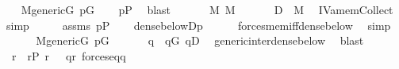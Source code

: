 \begin{isabellebody}
\ \ \isamarkupfalse%
\ {\isacartoucheopen}M{\isacharunderscore}{\kern0pt}generic{\isacharparenleft}{\kern0pt}G{\isacharparenright}{\kern0pt}{\isacartoucheclose}\ {\isacartoucheopen}p{\isasymin}G{\isacartoucheclose}\isanewline
\ \ \isamarkupfalse%
\ {\isachardoublequoteopen}p{\isasymin}P{\isachardoublequoteclose}\ \isamarkupfalse%
\ blast\isanewline
\ \ \isamarkupfalse%
\isanewline
\ \ \isamarkupfalse%
\ {\isacartoucheopen}{\isasympi}{\isasymin}M{\isacartoucheclose}\ {\isacartoucheopen}{\isasymtau}{\isasymin}M{\isacartoucheclose}\isanewline
\ \ \isamarkupfalse%
\isanewline
\ \ \isamarkupfalse%
\ {\isachardoublequoteopen}{\isacharquery}{\kern0pt}D\ {\isasymin}\ M{\isachardoublequoteclose}\ \isamarkupfalse%
\ IV{}{}{}a{\isacharunderscore}{\kern0pt}mem{\isacharunderscore}{\kern0pt}Collect\ \isamarkupfalse%
\ simp\isanewline
\ \ \isamarkupfalse%
\ \isamarkupfalse%
\ assms\ {\isacartoucheopen}p{\isasymin}P{\isacartoucheclose}\isanewline
\ \ \isamarkupfalse%
\ {\isachardoublequoteopen}dense{\isacharunderscore}{\kern0pt}below{\isacharparenleft}{\kern0pt}{\isacharquery}{\kern0pt}D{\isacharcomma}{\kern0pt}p{\isacharparenright}{\kern0pt}{\isachardoublequoteclose}\isanewline
\ \ \ \ \isamarkupfalse%
\ forces{\isacharunderscore}{\kern0pt}mem{\isacharunderscore}{\kern0pt}iff{\isacharunderscore}{\kern0pt}dense{\isacharunderscore}{\kern0pt}below\ \isamarkupfalse%
\ simp\isanewline
\ \ \isamarkupfalse%
\isanewline
\ \ \isamarkupfalse%
\ {\isacartoucheopen}M{\isacharunderscore}{\kern0pt}generic{\isacharparenleft}{\kern0pt}G{\isacharparenright}{\kern0pt}{\isacartoucheclose}\ {\isacartoucheopen}p{\isasymin}G{\isacartoucheclose}\isanewline
\ \ \isamarkupfalse%
\isanewline
\ \ \isamarkupfalse%
\ q\ \ {\isachardoublequoteopen}q{\isasymin}G{\isachardoublequoteclose}\ {\isachardoublequoteopen}q{\isasymin}{\isacharquery}{\kern0pt}D{\isachardoublequoteclose}\ \isamarkupfalse%
\ generic{\isacharunderscore}{\kern0pt}inter{\isacharunderscore}{\kern0pt}dense{\isacharunderscore}{\kern0pt}below\ \isamarkupfalse%
\ blast\isanewline
\ \ \isamarkupfalse%
\isanewline
\ \ \isamarkupfalse%
\ {\isasymsigma}\ r\ \ {\isachardoublequoteopen}r{\isasymin}P{\isachardoublequoteclose}\ {\isachardoublequoteopen}{\isasymlangle}{\isasymsigma}{\isacharcomma}{\kern0pt}r{\isasymrangle}\ {\isasymin}\ {\isasymtau}{\isachardoublequoteclose}\ {\isachardoublequoteopen}q{\isasympreceq}r{\isachardoublequoteclose}\ {\isachardoublequoteopen}forces{\isacharunderscore}{\kern0pt}eq{\isacharparenleft}{\kern0pt}q{\isacharcomma}{\kern0pt}{\isasympi}{\isacharcomma}{\kern0pt}{\isasymsigma}{\isacharparenright}{\kern0pt}{\isachardoublequoteclose}\ \isamarkupfalse%

\end{isabellebody}
